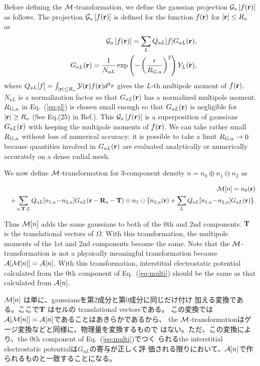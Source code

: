\documentclass[twocolumn,showpacs,preprintnumbers,amsmath,amssymb,floatfix]{revtex4-1}
\newcommand{\bfr}{{\bf r}}
\newcommand{\bfT}{{\bf T}}
\newcommand{\bfR}{{\bf R}}
\newcommand{\YY}{{\cal Y}}
\newcommand{\GG}{{\cal G}}
\newcommand{\ooplus}{\oplus}
\newcommand{\oominus}{\ominus}
\def\calR{{\cal A}}
\newcommand{\req}[1]{\mbox{Eq.~\!(\ref{#1})}}
\def\RGSa{R_{{\rm G},a}}
\def\MM{{\cal M}}
\def\intaa{\int_{|\bfr|\leq R_a}}
\begin{document}
Before defining the $\MM$-transformation, we define the gaussian
projection $\GG_a \left[f(\bfr)\right]$ as follows.  The projection
$\GG_a \left[f(\bfr)\right]$ is defined for the function $f(\bfr)$ for
$|\bfr|\leq R_a$ as
\begin{eqnarray}
&&\GG_a \left[f(\bfr)\right]
=\sum_L Q_{aL}[f] G_{aL}(\bfr), \label{eq:gdef} \\
&&G_{aL}(\bfr)= \frac{1}{N_{aL}} \exp\left(-\left(\frac{r}{\RGSa}\right)^2\right)
Y_L(\hat{\bfr}),\label{eq:gl}
\end{eqnarray}
where $Q_{aL}[f]=\intaa \YY(\bfr) f(\bfr) d^3r$
gives the $L$-th multipole moment of $f(\bfr)$.
$N_{aL}$ is a normalization factor
so that $G_{aL}(\bfr)$ has a normalized multipole moment.
$\RGSa$ in \req{eq:gl} is chosen small enough so that $G_{aL}(\bfr)$ is
negligible for $|\bfr|\geq R_a$ (See Eq.(25) in
Ref.\cite{lmfchap}). This $\GG_a \left[f(\bfr)\right]$ is a
superposition of gaussians $G_{aL}(\bfr)$ with keeping the multipole
moments of $f(\bfr)$.  We can take rather small $\RGSa$ without loss of
numerical accuracy; it is possible to take a limit $\RGSa \to 0$ because
quantities involved in $G_{aL}(\bfr)$ are evaluated analytically or
numerically accurately on a dense radial mesh.

We now define $\MM$-transformation for
3-component density $n= n_0 \ooplus n_1 \oominus n_2$ as
\begin{widetext}
\begin{eqnarray}
&&\MM[n]=  n_0(\bfr) \nonumber \\
&&+ \sum_{a,\bfT,L} Q_{aL}[n_{1,a}\!-\!n_{2,a}]G_{aL}(\bfr-\bfR_a-\bfT) 
\ooplus n_{1} \oominus 
\{n_{2,a}(\bfr) + \sum_L Q_{aL}[n_{1,a}\!-\!n_{2,a}]G_{aL}(\bfr) \}. \label{eq:multi}
\end{eqnarray}
\end{widetext}
Thus $\MM[n]$ adds the same gaussians to both of the 0th and 2nd
components.  $\bfT$ is the translational vectors of $\Omega$.  With this
transformation, the multipole moments of the 1st and 2nd components become
the same.  Note that the $\MM$-transformation is not a physically
meaningful transformation because $\calR[\MM[n]]=\calR[n]$.  With this
transformation, interstitial electrostatic potential calculated from the
0th component of \req{eq:multi} should be the same as that calculated
from $\calR[n]$.

$\MM[n]$ は単に、gaussiansを第2成分と第0成分に同じだけ付け
加える変換である。ここで$\bfT$ はセルの translational vectorsである。
この変換では$\calR[\MM[n]]=\calR[n]$であることはあきらかであるから、
the $\MM$-transformationはゲージ変換などと同様に、物理量を変換するもので
はない。ただ、この変換により、the 0th component of \req{eq:multi}でつく
られるthe interstitial electrostatic potentialは$G_{aL}$の寄与が正しく評
価される限りにおいて、$\calR[n]$で作られるものと一致することになる。
\end{document}
